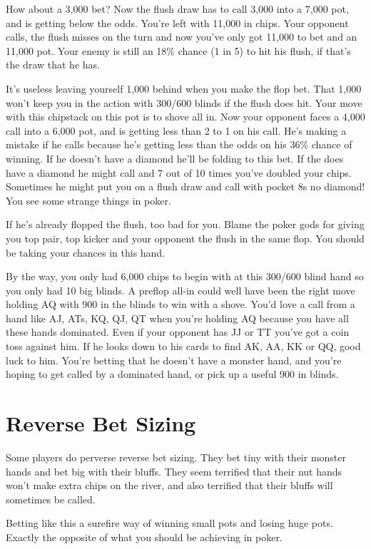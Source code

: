 How about a 3,000 bet? Now the flush draw has to call 3,000 into a 7,000 pot,
and is getting below the odds. You're left with 11,000 in chips. Your
opponent calls, the flush misses on the turn and now you've only got
11,000 to bet and an 11,000 pot. Your enemy is still an 18\% chance 
(1 in 5) to hit his flush, if that's the draw that he has.

It's useless leaving yourself 1,000 behind when you make the flop bet.
That 1,000 won't keep you in the action with 300/600 blinds if the
flush does hit. Your move with this chipstack on this pot is to shove
all in. Now your opponent faces a 4,000 call into a 6,000 pot, and is
getting less than 2 to 1 on his call. He's making a mistake if he calls
because he's getting less than the odds on his 36\% chance of winning.
If he doesn't have a diamond he'll be folding to this bet. If the does
have a diamond he might call and 7 out of 10 times you've doubled your chips.
Sometimes he might put you on a flush draw and call with pocket 8s no
diamond! You see some strange things in poker.

If he's already flopped the flush, too bad for you. Blame the poker gods
for giving you top pair, top kicker and your opponent the flush in
the same flop. You should be taking your chances in this hand.

By the way, you only had 6,000 chips to begin with at this 300/600 blind
hand so you only had 10 big blinds. A preflop all-in could well have
been the right move holding AQ with 900 in the blinds to win with a shove.
You'd love a call from a hand like AJ, ATs, KQ, QJ, QT when you're holding
AQ because you have all these hands dominated. Even if your opponent
has JJ or TT you've got a coin toss against him. If he looks down to his
cards to find AK, AA, KK or QQ, good luck to him. You're betting that
he doesn't have a monster hand, and you're hoping to get called by a
dominated hand, or pick up a useful 900 in blinds.

\section{Reverse Bet Sizing}

Some players do perverse reverse bet sizing. They bet tiny with
their monster hands and bet big with their bluffs. They seem terrified
that their nut hands won't make extra chips on the river, and also terrified
that their bluffs will sometimes be called.

Betting like this a surefire way of winning small pots and losing huge pots.
Exactly the opposite of what you should be achieving in poker.


